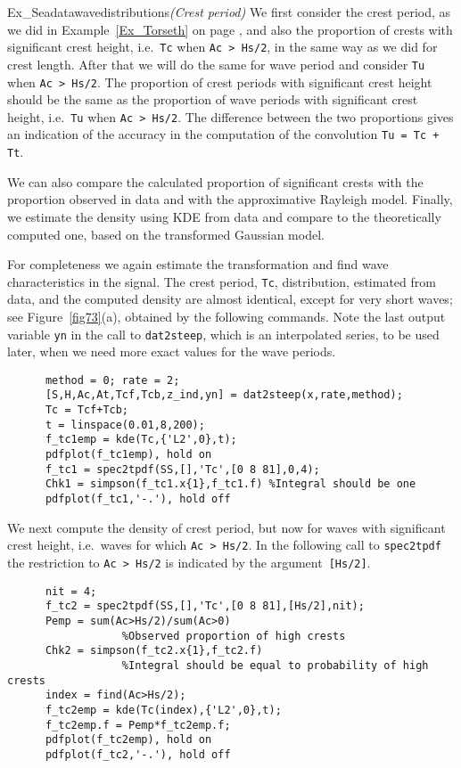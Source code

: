 \begin{cex}{Ex_Seadatawavedistributions}{\sl (Crest period)} 
We first consider the crest period,
as we did in Example~\ref{Ex_Torseth} 
on page \pageref{pageTorsethCrestPeriod}, and also the proportion of
crests with \label{page:Ex7a}
significant crest height, i.e.\ {\tt Tc} when {\tt Ac > Hs/2}, in the same way as we did for crest length.
After that we
will do the same for wave period and consider {\tt Tu} when {\tt Ac > Hs/2}.
The proportion of crest periods with significant crest height should be the
same as the proportion of wave periods with significant crest height,
i.e.\ {\tt Tu} when {\tt Ac > Hs/2}. 
The difference between the two proportions gives an indication of 
the accuracy in the computation of the convolution {\tt Tu = Tc + Tt}.

We can also compare the calculated proportion of significant crests
with the proportion observed in data and with the approximative
Rayleigh model. Finally, we estimate the density using KDE from data
and compare to the theoretically computed one, based on the transformed
Gaussian model. 

For completeness we again estimate the transformation and find wave
characteristics in the signal. The crest period, {\tt Tc}, distribution,
estimated from data, and the computed density are almost identical,
except for very short waves; see Figure~\ref{fig73}(a), obtained by
the following commands. Note the last output variable 
{\tt yn} in the call to {\tt dat2steep}, which
is an interpolated series, to be used later, when we need more exact values 
for the wave periods.\label{Interpol_yn}
{\small\begin{verbatim}
      method = 0; rate = 2;
      [S,H,Ac,At,Tcf,Tcb,z_ind,yn] = dat2steep(x,rate,method);
      Tc = Tcf+Tcb;
      t = linspace(0.01,8,200);
      f_tc1emp = kde(Tc,{'L2',0},t);
      pdfplot(f_tc1emp), hold on
      f_tc1 = spec2tpdf(SS,[],'Tc',[0 8 81],0,4);
      Chk1 = simpson(f_tc1.x{1},f_tc1.f) %Integral should be one
      pdfplot(f_tc1,'-.'), hold off
\end{verbatim}}

We next compute the density of crest period,
but now for waves with significant crest height, i.e.\ waves for
which {\tt Ac > Hs/2}. In the following call to
{\tt spec2tpdf} the restriction to {\tt Ac > Hs/2} is
indicated by the argument~\verb+[Hs/2]+.
{\small\begin{verbatim}
      nit = 4;
      f_tc2 = spec2tpdf(SS,[],'Tc',[0 8 81],[Hs/2],nit);
      Pemp = sum(Ac>Hs/2)/sum(Ac>0) 
      			  %Observed proportion of high crests
      Chk2 = simpson(f_tc2.x{1},f_tc2.f) 
      			  %Integral should be equal to probability of high crests
      index = find(Ac>Hs/2);
      f_tc2emp = kde(Tc(index),{'L2',0},t);
      f_tc2emp.f = Pemp*f_tc2emp.f;
      pdfplot(f_tc2emp), hold on
      pdfplot(f_tc2,'-.'), hold off
\end{verbatim}}


\end{cex}
